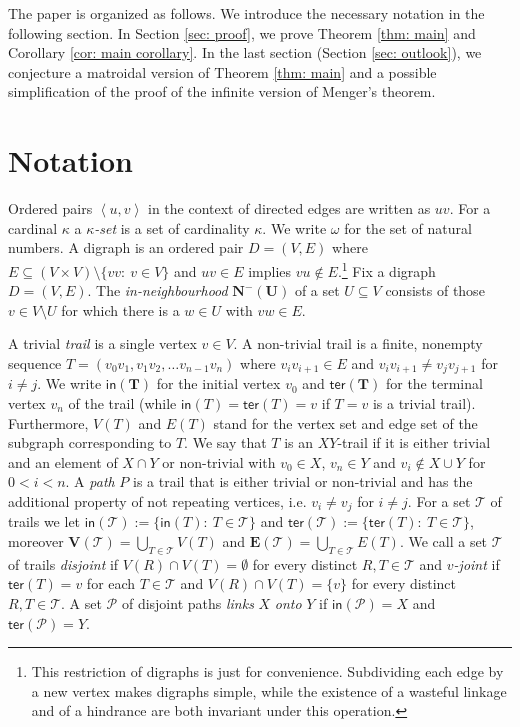 \documentclass[12pt,a4paper]{amsart}
\theoremstyle{plain}
\theoremstyle{definition}
\begin{document}
The paper is organized as follows. We introduce the necessary notation in the following section. In Section 
\ref{sec: proof}, we prove 
Theorem \ref{thm: main} and Corollary \ref{cor: main corollary}. In the last section (Section \ref{sec: outlook}), we 
conjecture a matroidal version of  
Theorem \ref{thm: main} and a possible simplification of the proof of the infinite version of Menger's theorem.

\section{Notation}
Ordered pairs $ \left\langle u, v\right\rangle $ in the context of directed edges are written as $ uv $. For a cardinal $ \kappa 
$ a $ \kappa 
$\emph{-set} 
is a set of cardinality $ \kappa $. We write $ \omega $ for the set of  natural numbers. A digraph is an ordered pair $ D=(V,E) $ 
where $ E \subseteq (V\times 
V)\setminus \{vv:\ v\in V \} $ and $ uv\in E $ implies $ vu\notin E $.\footnote{This restriction of digraphs is just for 
convenience. Subdividing each edge by a new vertex makes digraphs simple, while the existence of a wasteful linkage and of 
a hindrance are both invariant under this operation.} Fix a digraph $ D=(V,E) $. The \emph{in-neighbourhood} $ 
\boldsymbol{N^{-}(U)} $ of a set $ U\subseteq V $ consists 
of those $ v\in 
V\setminus U $ 
for which there is a $ w\in U $ with $ vw\in E $.  

A trivial  
\emph{trail} is a single vertex $ v\in V $. A non-trivial trail is a finite, nonempty sequence $T= (v_0v_1, 
 v_1v_2, \dots v_{n-1}v_n) $  where $ v_iv_{i+1}\in E $ and $ v_iv_{i+1}\neq v_jv_{j+1} $ for $ i\neq j $. We write $ 
 \boldsymbol{\mathsf{in}(T)} $ for the initial vertex $ v_0 $ and $ \boldsymbol{\mathsf{ter}(T)} $ for the terminal vertex $ 
 v_n $ of the trail  (while $ \mathsf{in}(T)=\mathsf{ter}(T)=v $ if $ T=v $ is a trivial trail). 
 Furthermore, $ V(T) 
 $ and $ E(T)$ stand for the vertex set and edge set of 
 the subgraph corresponding to $ T $.  We say that $ T $ is an $ XY $-trail if it is either trivial and an element of $ X\cap Y $ 
 or non-trivial with $ v_0\in X $, $ v_n\in Y $ and $ v_i \notin 
 X\cup Y $ for $ 0<i<n $.  A \emph{path} $ P $ is a trail that is either trivial or non-trivial and has the additional property of not repeating vertices, 
 i.e.  $ v_i\neq v_j $ 
 for $ i\neq j $.    For a set $ 
\mathcal{T} $ of trails we let $ \boldsymbol{\mathsf{in}(\mathcal{T})}:=\{ \mathsf{in}(T):\ T\in \mathcal{T} \} $ and $ 
\boldsymbol{\mathsf{ter}(\mathcal{T})}:=\{ 
\mathsf{ter}(T):\ T\in \mathcal{T} \} $, moreover $ \boldsymbol{V(\mathcal{T})}=\bigcup_{T\in \mathcal{T}}V(T) $  and $ 
\boldsymbol{E(\mathcal{T})}=\bigcup_{T\in \mathcal{T}}E(T) $. We call a set $ \mathcal{T} $ of trails \emph{disjoint} if $ V(R)\cap 
V(T)=\emptyset  $ for every distinct $ R, T\in \mathcal{T} $ and  $ v $\emph{-joint} if $ \mathsf{ter}(T)=v $ 
for each $ T\in 
\mathcal{T} $ and $ V(R)\cap V(T)=\{ v \} $ for every distinct $ R, T\in \mathcal{T} $. A set $ \mathcal{P} $ of disjoint 
paths \emph{links} $ X $ \emph{onto} $ Y $ if $ \mathsf{in}(\mathcal{P})=X $ and $ \mathsf{ter}(\mathcal{P})=Y $.
\end{document}
